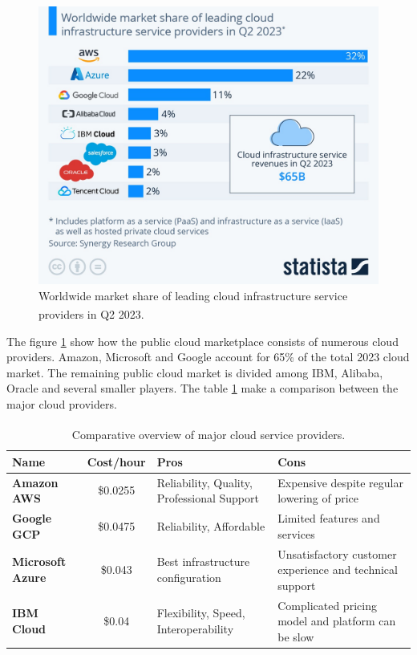 \begin{figure}
    \centering
    \includegraphics[scale=0.25]{Pictures/3_cloud_vendors.png}
    \caption{Worldwide market share of leading cloud infrastructure service providers in Q2 2023\textsuperscript{\cite{market_cloud_vendors}}.}
    \label{fig:3_cloud_vendors}
\end{figure}

The figure \ref{fig:3_cloud_vendors} show how the public cloud marketplace consists of numerous
cloud providers. Amazon, Microsoft and Google account for 65\% of the total 2023 cloud market. The
remaining public cloud market is divided among IBM, Alibaba, Oracle and several smaller players. The
table \ref{tab:cloud_providers} make a comparison between the major cloud providers.

\begin{table}
    \centering
    \begin{tabular}{|l|c|p{3.8cm}|p{3.8cm}|}
        \hline
        \textbf{Name}            & \textbf{Cost/hour} & \textbf{Pros}                              & \textbf{Cons}                                            \\ \hline
        \textbf{Amazon AWS}      & \$0.0255           & Reliability, Quality, Professional Support & Expensive despite regular lowering of price              \\ \hline
        \textbf{Google GCP}      & \$0.0475           & Reliability, Affordable                    & Limited features and services                            \\ \hline
        \textbf{Microsoft Azure} & \$0.043            & Best infrastructure configuration          & Unsatisfactory customer experience and technical support \\ \hline
        \textbf{IBM Cloud}       & \$0.04             & Flexibility, Speed, Interoperability       & Complicated pricing model and platform can be slow       \\ \hline
    \end{tabular}
    \caption{Comparative overview of major cloud service providers\textsuperscript{\cite{top_cloud_vendors}}.}
    \label{tab:cloud_providers}
\end{table}

